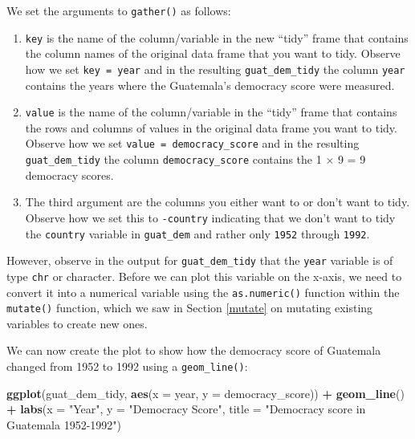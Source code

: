 \documentclass[12pt, krantz2,]{krantz}
\makeatletter
\newenvironment{Shaded}{\begin{snugshade}}{\end{snugshade}}
\newcommand{\DataTypeTok}[1]{\textcolor[rgb]{0.27,0.27,0.27}{#1}}
\newcommand{\KeywordTok}[1]{\textcolor[rgb]{0.27,0.27,0.27}{\textbf{#1}}}
\newcommand{\NormalTok}[1]{#1}
\newcommand{\OperatorTok}[1]{\textcolor[rgb]{0.43,0.43,0.43}{\textbf{#1}}}
\newcommand{\StringTok}[1]{\textcolor[rgb]{0.5,0.5,0.5}{#1}}
\providecommand{\tightlist}{%
  \setlength{\itemsep}{0pt}\setlength{\parskip}{0pt}}
\newenvironment{kframe}{%
\medskip{}
\setlength{\fboxsep}{.8em}
 \def\at@end@of@kframe{}%
 \ifinner\ifhmode%
  \def\at@end@of@kframe{\end{minipage}}%
  \begin{minipage}{\columnwidth}%
 \fi\fi%
 \def\FrameCommand##1{\hskip\@totalleftmargin \hskip-\fboxsep
 \colorbox{shadecolor}{##1}\hskip-\fboxsep
     \hskip-\linewidth \hskip-\@totalleftmargin \hskip\columnwidth}%
 \MakeFramed {\advance\hsize-\width
   \@totalleftmargin\z@ \linewidth\hsize
   \@setminipage}}%
 {\par\unskip\endMakeFramed%
 \at@end@of@kframe}
\renewenvironment{Shaded}{\begin{kframe}}{\end{kframe}}
\makeatother
\begin{document}
We set the arguments to \texttt{gather()} as follows:

\begin{enumerate}
\def\labelenumi{\arabic{enumi}.}
\tightlist
\item
  \texttt{key} is the name of the column/variable in the new ``tidy'' frame that contains the column names of the original data frame that you want to tidy. Observe how we set \texttt{key\ =\ year} and in the resulting \texttt{guat\_dem\_tidy} the column \texttt{year} contains the years where the Guatemala's democracy score were measured.
\item
  \texttt{value} is the name of the column/variable in the ``tidy'' frame that contains the rows and columns of values in the original data frame you want to tidy. Observe how we set \texttt{value\ =\ democracy\_score} and in the resulting \texttt{guat\_dem\_tidy} the column \texttt{democracy\_score} contains the 1 \(\times\) 9 = 9 democracy scores.
\item
  The third argument are the columns you either want to or don't want to tidy. Observe how we set this to \texttt{-country} indicating that we don't want to tidy the \texttt{country} variable in \texttt{guat\_dem} and rather only \texttt{1952} through \texttt{1992}.
\end{enumerate}

However, observe in the output for \texttt{guat\_dem\_tidy} that the \texttt{year} variable is of type \texttt{chr} or character. Before we can plot this variable on the x-axis, we need to convert it into a numerical variable using the \texttt{as.numeric()} function within the \texttt{mutate()} function, which we saw in Section \ref{mutate} on mutating existing variables to create new ones.

\begin{Shaded}
\end{Shaded}

We can now create the plot to show how the democracy score of Guatemala changed from 1952 to 1992 using a \texttt{geom\_line()}:

\begin{Shaded}
\begin{Highlighting}[]
\KeywordTok{ggplot}\NormalTok{(guat_dem_tidy, }\KeywordTok{aes}\NormalTok{(}\DataTypeTok{x =}\NormalTok{ year, }\DataTypeTok{y =}\NormalTok{ democracy_score)) }\OperatorTok{+}
\StringTok{  }\KeywordTok{geom_line}\NormalTok{() }\OperatorTok{+}
\StringTok{  }\KeywordTok{labs}\NormalTok{(}\DataTypeTok{x =} \StringTok{"Year"}\NormalTok{, }\DataTypeTok{y =} \StringTok{"Democracy Score"}\NormalTok{, }\DataTypeTok{title =} \StringTok{"Democracy score in Guatemala 1952-1992"}\NormalTok{)}
\end{Highlighting}
\end{Shaded}
\end{document}
